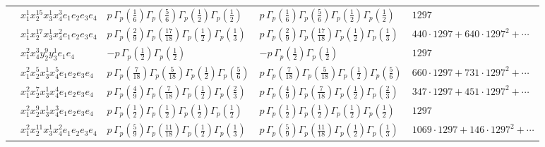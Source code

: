\documentclass[11pt]{article}
\begin{document}
\begin{table}[ht]
{\begin{tabular}{@{}lllll@{}}
 & $x_{1}^{1} x_{2}^{15} x_{3}^{1} x_{4}^{3}  e_{1} e_{2} e_{3} e_{4}$ & $p \, \Gamma_p \left( \frac{1}{6} \right) \Gamma_p \left( \frac{5}{6} \right) \Gamma_p \left( \frac{1}{2} \right) \Gamma_p \left( \frac{1}{2} \right)$ & $p \, \Gamma_p \left( \frac{1}{6} \right) \Gamma_p \left( \frac{5}{6} \right) \Gamma_p \left( \frac{1}{2} \right) \Gamma_p \left( \frac{1}{2} \right)$ & $1297$ \\
 & $x_{1}^{1} x_{2}^{17} x_{3}^{1} x_{4}^{2}  e_{1} e_{2} e_{3} e_{4}$ & $p \, \Gamma_p \left( \frac{2}{9} \right) \Gamma_p \left( \frac{17}{18} \right) \Gamma_p \left( \frac{1}{2} \right) \Gamma_p \left( \frac{1}{3} \right)$ & $p \, \Gamma_p \left( \frac{2}{9} \right) \Gamma_p \left( \frac{17}{18} \right) \Gamma_p \left( \frac{1}{2} \right) \Gamma_p \left( \frac{1}{3} \right)$ & $440{\cdot}1297{+}640{\cdot}1297^{2}{+}\cdots$ \\
 & $x_{1}^{2} x_{4}^{3} y_{2}^{9} y_{3}^{1} e_{1} e_{4}$ & $- p \, \Gamma_p \left( \frac{1}{2} \right) \Gamma_p \left( \frac{1}{2} \right)$ & $- p \, \Gamma_p \left( \frac{1}{2} \right) \Gamma_p \left( \frac{1}{2} \right)$ & $1297$ \\
 & $x_{1}^{2} x_{2}^{5} x_{3}^{1} x_{4}^{5}  e_{1} e_{2} e_{3} e_{4}$ & $p \, \Gamma_p \left( \frac{7}{18} \right) \Gamma_p \left( \frac{5}{18} \right) \Gamma_p \left( \frac{1}{2} \right) \Gamma_p \left( \frac{5}{6} \right)$ & $p \, \Gamma_p \left( \frac{7}{18} \right) \Gamma_p \left( \frac{5}{18} \right) \Gamma_p \left( \frac{1}{2} \right) \Gamma_p \left( \frac{5}{6} \right)$ & $660{\cdot}1297{+}731{\cdot}1297^{2}{+}\cdots$ \\
 & $x_{1}^{2} x_{2}^{7} x_{3}^{1} x_{4}^{4}  e_{1} e_{2} e_{3} e_{4}$ & $p \, \Gamma_p \left( \frac{4}{9} \right) \Gamma_p \left( \frac{7}{18} \right) \Gamma_p \left( \frac{1}{2} \right) \Gamma_p \left( \frac{2}{3} \right)$ & $p \, \Gamma_p \left( \frac{4}{9} \right) \Gamma_p \left( \frac{7}{18} \right) \Gamma_p \left( \frac{1}{2} \right) \Gamma_p \left( \frac{2}{3} \right)$ & $347{\cdot}1297{+}451{\cdot}1297^{2}{+}\cdots$ \\
 & $x_{1}^{2} x_{2}^{9} x_{3}^{1} x_{4}^{3}  e_{1} e_{2} e_{3} e_{4}$ & $p \, \Gamma_p \left( \frac{1}{2} \right) \Gamma_p \left( \frac{1}{2} \right) \Gamma_p \left( \frac{1}{2} \right) \Gamma_p \left( \frac{1}{2} \right)$ & $p \, \Gamma_p \left( \frac{1}{2} \right) \Gamma_p \left( \frac{1}{2} \right) \Gamma_p \left( \frac{1}{2} \right) \Gamma_p \left( \frac{1}{2} \right)$ & $1297$ \\
 & $x_{1}^{2} x_{2}^{11} x_{3}^{1} x_{4}^{2}  e_{1} e_{2} e_{3} e_{4}$ & $p \, \Gamma_p \left( \frac{5}{9} \right) \Gamma_p \left( \frac{11}{18} \right) \Gamma_p \left( \frac{1}{2} \right) \Gamma_p \left( \frac{1}{3} \right)$ & $p \, \Gamma_p \left( \frac{5}{9} \right) \Gamma_p \left( \frac{11}{18} \right) \Gamma_p \left( \frac{1}{2} \right) \Gamma_p \left( \frac{1}{3} \right)$ & $1069{\cdot}1297{+}146{\cdot}1297^{2}{+}\cdots$ \\

\end{tabular}}
\end{table}
\end{document}

